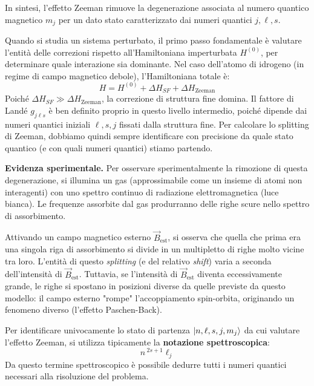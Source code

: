 In sintesi, l'effetto Zeeman rimuove la degenerazione associata al numero quantico magnetico \( m_j \) per un dato stato caratterizzato dai numeri quantici \( j, \ell, s \).

Quando si studia un sistema perturbato, il primo passo fondamentale è valutare l'entità delle correzioni rispetto all'Hamiltoniana imperturbata \( H^{(0)} \), per determinare quale interazione sia dominante. Nel caso dell'atomo di idrogeno (in regime di campo magnetico debole), l'Hamiltoniana totale è:
\begin{equation}
    H = H^{(0)} + \Delta H_{SF} + \Delta H_{\text{Zeeman}}
\end{equation}
Poiché \( \Delta H_{SF} \gg \Delta H_{\text{Zeeman}} \), la correzione di struttura fine domina. Il fattore di Landé \( g_{j\ell s} \) è ben definito proprio in questo livello intermedio, poiché dipende dai numeri quantici iniziali \( \ell, s, j \) fissati dalla struttura fine. Per calcolare lo splitting di Zeeman, dobbiamo quindi sempre identificare con precisione da quale stato quantico (e con quali numeri quantici) stiamo partendo.

\textbf{Evidenza sperimentale.} Per osservare sperimentalmente la rimozione di questa degenerazione, si illumina un gas (approssimabile come un insieme di atomi non interagenti) con uno spettro continuo di radiazione elettromagnetica (luce bianca). Le frequenze assorbite dal gas produrranno delle righe scure nello spettro di assorbimento. 

Attivando un campo magnetico esterno \( \vec{B}_{\text{est}} \), si osserva che quella che prima era una singola riga di assorbimento si divide in un multipletto di righe molto vicine tra loro. L'entità di questo \textit{splitting} (e del relativo \textit{shift}) varia a seconda dell'intensità di \( \vec{B}_{\text{est}} \).
Tuttavia, se l'intensità di \( \vec{B}_{\text{est}} \) diventa eccessivamente grande, le righe si spostano in posizioni diverse da quelle previste da questo modello: il campo esterno "rompe" l'accoppiamento spin-orbita, originando un fenomeno diverso (l'effetto Paschen-Back).

\begin{attention}
    Per identificare univocamente lo stato di partenza \(\ket{n, \ell, s, j, m_j}\) da cui valutare l'effetto Zeeman, si utilizza tipicamente la \textbf{notazione spettroscopica}:
    \begin{equation*}
        n \, ^{2s+1}\ell_j
    \end{equation*}
    Da questo termine spettroscopico è possibile dedurre tutti i numeri quantici necessari alla risoluzione del problema.
\end{attention}

